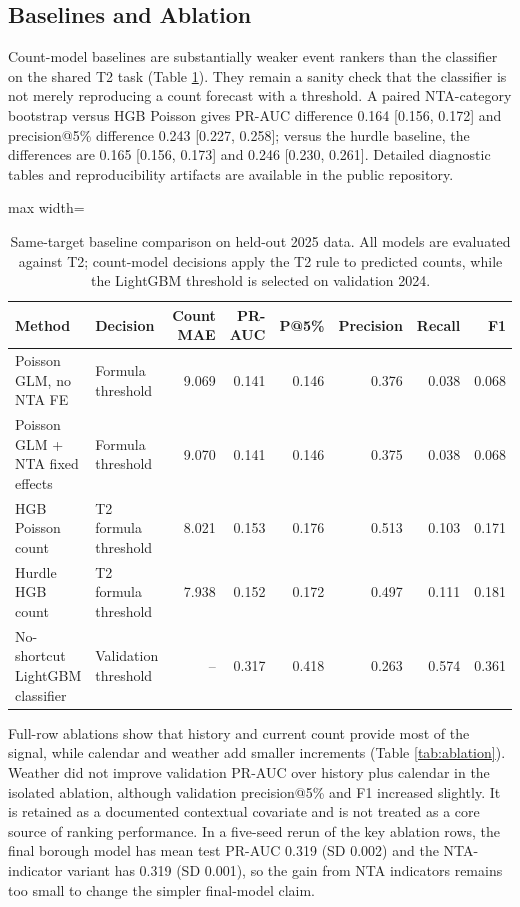 \documentclass[pdflatex,sn-mathphys-num]{sn-jnl}
\begin{document}
\subsection{Baselines and Ablation}\label{subsec:ablation}

Count-model baselines are substantially weaker event rankers than the classifier on the shared T2 task (Table \ref{tab:baselines}). They remain a sanity check that the classifier is not merely reproducing a count forecast with a threshold. A paired NTA-category bootstrap versus HGB Poisson gives PR-AUC difference 0.164 [0.156, 0.172] and precision@5\% difference 0.243 [0.227, 0.258]; versus the hurdle baseline, the differences are 0.165 [0.156, 0.173] and 0.246 [0.230, 0.261]. Detailed diagnostic tables and reproducibility artifacts are available in the public repository.

\begin{table}[!htbp]
\caption{Same-target baseline comparison on held-out 2025 data. All models are evaluated against T2; count-model decisions apply the T2 rule to predicted counts, while the LightGBM threshold is selected on validation 2024.}\label{tab:baselines}
\centering
\begin{adjustbox}{max width=\textwidth}
\begin{tabular}{@{}llrrrrrr@{}}
\toprule
Method & Decision & Count MAE & PR-AUC & P@5\% & Precision & Recall & F1 \\
\midrule
Poisson GLM, no NTA FE & Formula threshold & 9.069 & 0.141 & 0.146 & 0.376 & 0.038 & 0.068 \\
Poisson GLM + NTA fixed effects & Formula threshold & 9.070 & 0.141 & 0.146 & 0.375 & 0.038 & 0.068 \\
HGB Poisson count & T2 formula threshold & 8.021 & 0.153 & 0.176 & 0.513 & 0.103 & 0.171 \\
Hurdle HGB count & T2 formula threshold & 7.938 & 0.152 & 0.172 & 0.497 & 0.111 & 0.181 \\
No-shortcut LightGBM classifier & Validation threshold & -- & 0.317 & 0.418 & 0.263 & 0.574 & 0.361 \\
\bottomrule
\end{tabular}
\end{adjustbox}
\end{table}

Full-row ablations show that history and current count provide most of the signal, while calendar and weather add smaller increments (Table \ref{tab:ablation}). Weather did not improve validation PR-AUC over history plus calendar in the isolated ablation, although validation precision@5\% and F1 increased slightly. It is retained as a documented contextual covariate and is not treated as a core source of ranking performance. In a five-seed rerun of the key ablation rows, the final borough model has mean test PR-AUC 0.319 (SD 0.002) and the NTA-indicator variant has 0.319 (SD 0.001), so the gain from NTA indicators remains too small to change the simpler final-model claim.
\end{document}
